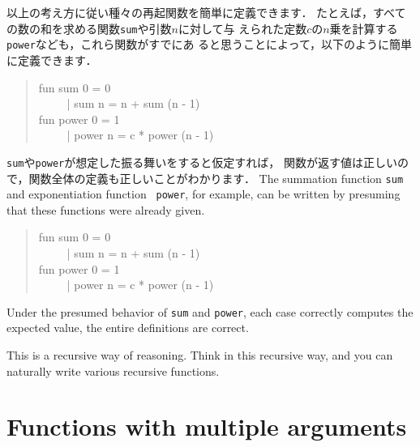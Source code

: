 \documentclass{jbook}
\newcommand{\txt}[2]{#2}
\begin{document}
\ifx\jp%
	以上の考え方に従い種々の再起関数を簡単に定義できます．
	たとえば，すべての数の和を求める関数{\tt sum}や引数$n$に対して与
えられた定数$c$の$n$乗を計算する{\tt power}なども，これら関数がすでにあ
ると思うことによって，以下のように簡単に定義できます．
\begin{tt}
\begin{quote}
fun sum 0 = 0\\
\ \ \ \ \ | sum n = n + sum (n - 1)\\
fun power 0 = 1\\
\ \ \ \ \ | power n = c * power (n - 1)
\end{quote}
\end{tt}
	{\tt sum}や{\tt power}が想定した振る舞いをすると仮定すれば，
関数が返す値は正しいので，関数全体の定義も正しいことがわかります．
\else%
	The summation function {\tt sum} and exponentiation  function {\tt
power}, for example, can be written by presuming that these functions
were already given.
\begin{tt}
\begin{quote}
fun sum 0 = 0\\
\ \ \ \ \ | sum n = n + sum (n - 1)\\
fun power 0 = 1\\
\ \ \ \ \ | power n = c * power (n - 1)
\end{quote}
\end{tt}
	Under the presumed behavior of {\tt sum} and {\tt power}, each
case correctly computes the expected value, the entire definitions
are correct.

	This is a recursive way of reasoning.
	Think in this recursive way, and you can naturally write various
recursive functions. 
\fi%

\section{\txt{複数の引数を取る関数}{Functions with multiple arguments}}
\label{sec:tutorialMultiargfun}
\end{document}
